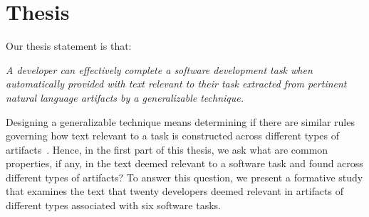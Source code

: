 

\section{Thesis}
\label{cp1:thesis}




Our thesis statement is that:




\bigskip
\begin{bluequote}
    \textit{A developer can effectively complete a software development task when automatically provided with text relevant to their task extracted from pertinent natural language artifacts
    by a generalizable technique.}
\end{bluequote}
\medskip



Designing a generalizable technique means 
determining if there are similar rules governing how text relevant to a task is 
constructed across different types of artifacts~\cite{Kintsch1978a}.
Hence, in the first part of this thesis, 
we ask what are common properties, if any, in the text deemed relevant 
to a software task and found across different types of artifacts?
To answer this question, we present a formative study that 
examines the text that twenty developers deemed relevant in artifacts 
of different types associated with six software tasks.

